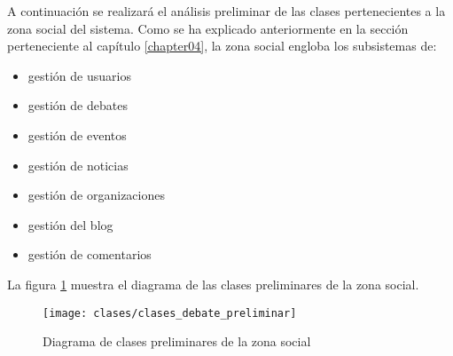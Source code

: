 A continuación se realizará el análisis preliminar de las clases pertenecientes a la zona social del sistema.  Como se ha explicado anteriormente en la sección  perteneciente al capítulo \ref{chapter04}, la zona social engloba los subsistemas de:
\begin{itemize}
	\item gestión de usuarios
	\item gestión de debates
	\item gestión de eventos
	\item gestión de noticias
	\item gestión de organizaciones
	\item gestión del blog
	\item gestión de comentarios
\end{itemize}

La figura \ref{fig:clases_preliminares_modelo_debate} muestra el diagrama de las clases preliminares de la zona social.

\begin{landscape}
	\begin{figure}[ht]
		\centering
		\texttt{[image: clases/clases\_debate\_preliminar]}
		\caption{Diagrama de clases preliminares de la zona social}
		\label{fig:clases_preliminares_modelo_debate}
	\end{figure}
\end{landscape}

